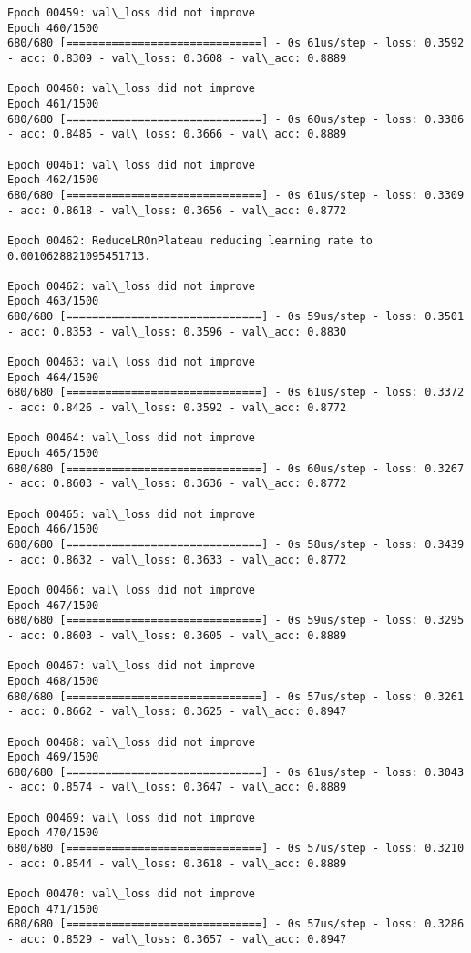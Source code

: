 \documentclass[11pt]{article}
\begin{document}
\begin{Verbatim}[commandchars=\\\{\}]
Epoch 00459: val\_loss did not improve
Epoch 460/1500
680/680 [==============================] - 0s 61us/step - loss: 0.3592 - acc: 0.8309 - val\_loss: 0.3608 - val\_acc: 0.8889

Epoch 00460: val\_loss did not improve
Epoch 461/1500
680/680 [==============================] - 0s 60us/step - loss: 0.3386 - acc: 0.8485 - val\_loss: 0.3666 - val\_acc: 0.8889

Epoch 00461: val\_loss did not improve
Epoch 462/1500
680/680 [==============================] - 0s 61us/step - loss: 0.3309 - acc: 0.8618 - val\_loss: 0.3656 - val\_acc: 0.8772

Epoch 00462: ReduceLROnPlateau reducing learning rate to 0.0010628821095451713.

Epoch 00462: val\_loss did not improve
Epoch 463/1500
680/680 [==============================] - 0s 59us/step - loss: 0.3501 - acc: 0.8353 - val\_loss: 0.3596 - val\_acc: 0.8830

Epoch 00463: val\_loss did not improve
Epoch 464/1500
680/680 [==============================] - 0s 61us/step - loss: 0.3372 - acc: 0.8426 - val\_loss: 0.3592 - val\_acc: 0.8772

Epoch 00464: val\_loss did not improve
Epoch 465/1500
680/680 [==============================] - 0s 60us/step - loss: 0.3267 - acc: 0.8603 - val\_loss: 0.3636 - val\_acc: 0.8772

Epoch 00465: val\_loss did not improve
Epoch 466/1500
680/680 [==============================] - 0s 58us/step - loss: 0.3439 - acc: 0.8632 - val\_loss: 0.3633 - val\_acc: 0.8772

Epoch 00466: val\_loss did not improve
Epoch 467/1500
680/680 [==============================] - 0s 59us/step - loss: 0.3295 - acc: 0.8603 - val\_loss: 0.3605 - val\_acc: 0.8889

Epoch 00467: val\_loss did not improve
Epoch 468/1500
680/680 [==============================] - 0s 57us/step - loss: 0.3261 - acc: 0.8662 - val\_loss: 0.3625 - val\_acc: 0.8947

Epoch 00468: val\_loss did not improve
Epoch 469/1500
680/680 [==============================] - 0s 61us/step - loss: 0.3043 - acc: 0.8574 - val\_loss: 0.3647 - val\_acc: 0.8889

Epoch 00469: val\_loss did not improve
Epoch 470/1500
680/680 [==============================] - 0s 57us/step - loss: 0.3210 - acc: 0.8544 - val\_loss: 0.3618 - val\_acc: 0.8889

Epoch 00470: val\_loss did not improve
Epoch 471/1500
680/680 [==============================] - 0s 57us/step - loss: 0.3286 - acc: 0.8529 - val\_loss: 0.3657 - val\_acc: 0.8947


\end{Verbatim}
\end{document}
